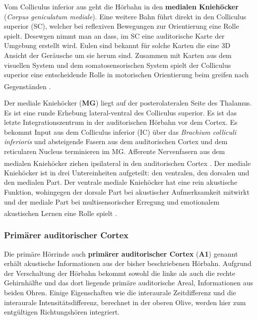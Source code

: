 \documentclass[12pt,a4paper,pdftex]{article}
\begin{document}
Vom Colliculus inferior aus geht die Hörbahn in den \textbf{medialen Kniehöcker} (\textit{Corpus geniculatum mediale}).  Eine weitere Bahn führt direkt in den Colliculus superior (SC), welcher bei reflexiven Bewegungen zur Orientierung eine Rolle spielt. Desewgen nimmt man an dass, im SC eine auditorische Karte der Umgebung erstellt wird. Eulen sind bekannt für solche Karten die eine 3D Ansicht der Geräusche um sie herum sind. Zusammen mit Karten aus dem visuellen System und dem somatosensorischen System spielt der Colliculus superior eine entscheidende Rolle in motorischen Orientierung beim greifen nach Gegenständen \textsuperscript{\cite[31]{kandel2013principles}}.

Der mediale Kniehöcker (\textbf{MG}) liegt auf der posterolateralen Seite des Thalamus. Es ist eine runde Erhebung lateral-ventral des Colliculus superior. Es ist das letzte Integrationszentrum in der auditorischen Hörbahn vor dem Cortex. Es bekommt Input aus dem Colliculus inferior (IC) über das \textit{Brachium colliculi inferioris} und absteigende Fasern aus dem auditorischen Cortex und dem reticularen Nucleus terminieren im MG. Afferente Nervenfasern aus dem medialen Kniehöcker ziehen ipsilateral in den auditorischen Cortex \textsuperscript{\cite[29]{paxinos2014rat}}. Der mediale Kniehöcker ist in drei Untereinheiten aufgeteilt: den ventralen, den dorsalen und den medialen Part. Der ventrale mediale Kniehöcker hat eine rein akustische Funktion, wohingegen der dorsale Part bei akustischer Aufmerksamkeit mitwirkt und der mediale Part bei multisensorischer Erregung und emotionalem akustischen Lernen eine Rolle spielt \textsuperscript{\cite[29]{paxinos2014rat}}.


\subsubsection*{Primärer auditorischer Cortex}
Die primäre Hörrinde auch \textbf{primärer auditorischer Cortex} (\textbf{A1}) genannt erhält akustische Informationen aus der bisher beschriebenen Hörbahn. Aufgrund der Verschaltung der Hörbahn bekommt sowohl die linke als auch die rechte Gehirnhälfte und das dort liegende primäre auditorische Areal, Informationen aus beiden Ohren. Einige Eigenschaften wie die interaurale Zeitdifferenz und die interaurale Intensitätsdifferenz, berechnet in der oberen Olive, werden hier zum entgültigen Richtungshören integriert. 
\end{document}
